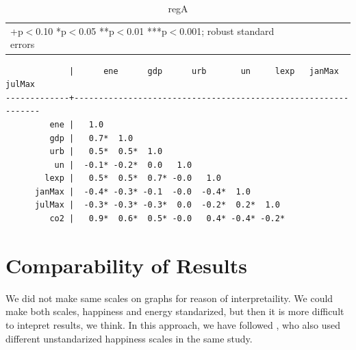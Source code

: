 \documentclass[10pt, letterpaper]{article}
\begin{document}
\begin{spacing}{1.4}
\begin{table}[H]\centering \caption{regA} \label{regA} \begin{scriptsize} \begin{tabular}{p{1.4in}p{.43in}p{.43in}p{.43in}p{.43in}p{.43in}p{.43in}p{.43in}p{.43in}p{.43in}p{.43 in}p{.43in}p{.43 in}}\hline  \hline\multicolumn{6}{l}{+p$<$0.10 *p$<$0.05 **p$<$0.01 ***p$<$0.001; robust standard errors} \end{tabular}\end{scriptsize}\end{table}

\begin{verbatim}
             |      ene      gdp      urb       un     lexp   janMax   julMax
-------------+---------------------------------------------------------------
         ene |   1.0 
         gdp |   0.7*  1.0 
         urb |   0.5*  0.5*  1.0 
          un |  -0.1* -0.2*  0.0   1.0 
        lexp |   0.5*  0.5*  0.7* -0.0   1.0 
      janMax |  -0.4* -0.3* -0.1  -0.0  -0.4*  1.0 
      julMax |  -0.3* -0.3* -0.3*  0.0  -0.2*  0.2*  1.0 
         co2 |   0.9*  0.6*  0.5* -0.0   0.4* -0.4* -0.2*

\end{verbatim}


\section{Comparability of Results}

We did not make same scales on graphs for reason of interpretaility. We could
make both scales, happiness and energy standarized, but then it is more
difficult to intepret results, we think. In this approach, we have followed
\citet{easterlin10B,easterlin12}, who also used different unstandarized
happiness scales in the same study. 


\end{spacing}
\end{document}
